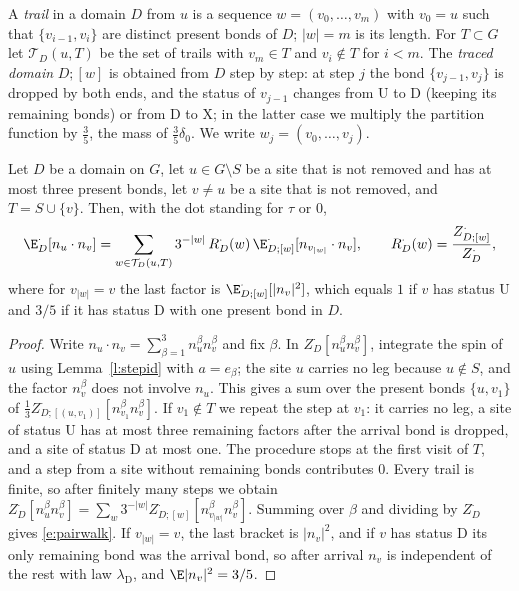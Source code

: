 A \emph{trail} in a domain $D$ from $u$ is a sequence $w = (v_0, \dots, v_m)$ with $v_0 = u$ such that $\{v_{i - 1}, v_i\}$ are distinct present bonds of $D$; $|w| = m$ is its length. For $T \subset G$ let $\mathcal T_D(u, T)$ be the set of trails with $v_m \in T$ and $v_i \notin T$ for $i < m$. The \emph{traced domain} $D;[w]$ is obtained from $D$ step by step: at step $j$ the bond $\{v_{j - 1}, v_j\}$ is dropped by both ends, and the status of $v_{j - 1}$ changes from $\mathrm U$ to $\mathrm D$ (keeping its remaining bonds) or from $\mathrm D$ to $\mathrm X$; in the latter case we multiply the partition function by $\frac35$, the mass of $\frac35 \delta_0$. We write $w_j = (v_0, \dots, v_j)$.

\begin{proposition}\label{p:pairwalk}
Let $D$ be a domain on $G$, let $u \in G \setminus S$ be a site that is not removed and has at most three present bonds, let $v \neq u$ be a site that is not removed, and $T = S \cup \{v\}$. Then, with the dot standing for $\tau$ or $0$,
\begin{equation}\label{e:pairwalk}
\E^\cdot_D[n_u \cdot n_v] = \sum_{w \in \mathcal T_D(u, T)} 3^{-|w|} \, R^\cdot_D(w) \, \E^\cdot_{D;[w]}[n_{v_{|w|}} \cdot n_v], \qquad R^\cdot_D(w) = \frac{Z^\cdot_{D;[w]}}{Z^\cdot_D},
\end{equation}
where for $v_{|w|} = v$ the last factor is $\E^\cdot_{D;[w]} [|n_v|^2]$, which equals $1$ if $v$ has status $\mathrm U$ and $3/5$ if it has status $\mathrm D$ with one present bond in $D$.
\end{proposition}

\begin{proof}
Write $n_u \cdot n_v = \sum_{\beta = 1}^3 n_u^\beta n_v^\beta$ and fix $\beta$. In $Z^\cdot_D[n_u^\beta n_v^\beta]$, integrate the spin of $u$ using Lemma~\ref{l:stepid} with $a = e_\beta$; the site $u$ carries no leg because $u \notin S$, and the factor $n_v^\beta$ does not involve $n_u$. This gives a sum over the present bonds $\{u, v_1\}$ of $\frac13 Z^\cdot_{D;[(u, v_1)]}[n_{v_1}^\beta n_v^\beta]$. If $v_1 \notin T$ we repeat the step at $v_1$: it carries no leg, a site of status $\mathrm U$ has at most three remaining factors after the arrival bond is dropped, and a site of status $\mathrm D$ at most one. The procedure stops at the first visit of $T$, and a step from a site without remaining bonds contributes $0$. Every trail is finite, so after finitely many steps we obtain $Z^\cdot_D[n_u^\beta n_v^\beta] = \sum_w 3^{-|w|} Z^\cdot_{D;[w]}[n_{v_{|w|}}^\beta n_v^\beta]$. Summing over $\beta$ and dividing by $Z^\cdot_D$ gives \eqref{e:pairwalk}. If $v_{|w|} = v$, the last bracket is $|n_v|^2$, and if $v$ has status $\mathrm D$ its only remaining bond was the arrival bond, so after arrival $n_v$ is independent of the rest with law $\lambda_{\mathrm D}$, and $\E|n_v|^2 = 3/5$.
\end{proof}


